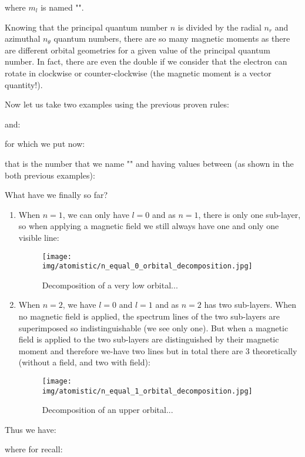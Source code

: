      where $m_l$ is named "". 
     
     Knowing that the principal quantum number $n$ is divided by the radial $n_r$ and azimuthal $n_\theta$ quantum numbers, there are so many magnetic moments as there are different orbital geometries for a given value of the principal quantum number. In fact, there are even the double if we consider that the electron can rotate in clockwise or counter-clockwise (the magnetic moment is a vector quantity!).
     
     Now let us take two examples using the previous proven rules:
    
     and:
     
    for which we put now:
    
     that is the number that we name "" and having values between (as shown in the both previous examples):
     
     What have we finally so far?
     \begin{enumerate}
         \item When $n=1$, we can only have $l=0$ and as $n=1$, there is only one sub-layer, so when applying a magnetic field we still always have one and only one visible line:
         \begin{figure}[H]
			\centering
			\texttt{[image: img/atomistic/n\_equal\_0\_orbital\_decomposition.jpg]}
			\caption{Decomposition of a very low orbital...}
		\end{figure}
			
		\item When $n=2$, we have $l=0$ and $l=1$ and as $n=2$ has two sub-layers. When no magnetic field is applied, the spectrum lines of the two sub-layers are superimposed so indistinguishable (we see only one). But when a magnetic field is applied to the two sub-layers are distinguished by their magnetic moment and therefore we-have two lines but in total there are 3 theoretically (without a field, and two with field):
		\begin{figure}[H]
			\centering
			\texttt{[image: img/atomistic/n\_equal\_1\_orbital\_decomposition.jpg]}
			\caption{Decomposition of an upper orbital...}
		\end{figure}
     \end{enumerate}
	Thus we have:
    
    where for recall\label{quantum number of orbital angular momentum interval}:
     
